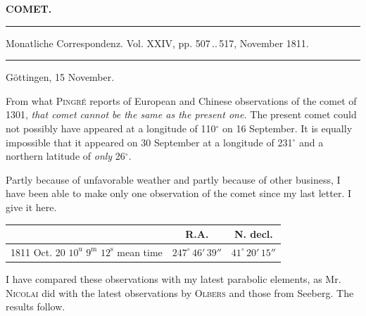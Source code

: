 \clearpage{}
\begin{center}\textbf{COMET.}\par\vspace{4pt}\hrule\vspace{4pt}\fontsize{10}{12}\selectfont Monatliche Correspondenz. Vol. XXIV, pp. 507\,..\,517, November 1811.\par\vspace{4pt}\hrule\vspace{4pt}\end{center}

\begin{flushright}Göttingen, 15 November.\end{flushright}
\par\indent From what \textsc{Pingré} reports of European and Chinese observations of the comet of 1301, \emph{that comet cannot be the same as the present one.} The present comet could not possibly have appeared at a longitude of 110$^\circ$ on 16 September. It is equally impossible that it appeared on 30 September at a longitude of 231$^\circ$ and a northern latitude of \emph{only} 26$^\circ$.


\par\indent Partly because of unfavorable weather and partly because of other business, I have been able to make only one observation of the comet since my last letter. I give it here.

\begin{center}
\fontsize{10}{12}\selectfont\setlength{\tabcolsep}{3pt}\renewcommand{\arraystretch}{1.15}\begin{tabular}{l|c|c}
 & R.A. & N. decl. \\ \hline
1811 Oct. 20 $10^{\mathrm u}$ $9^{\mathrm m}$ $12^{\mathrm s}$ mean time & $247^\circ\,46'\,39''$ & $41^\circ\,20'\,15''$ \\
\end{tabular}
\end{center}


\par\indent I have compared these observations with my latest parabolic elements, as Mr. \textsc{Nicolai} did with the latest observations by \textsc{Olbers} and those from Seeberg. The results follow.

